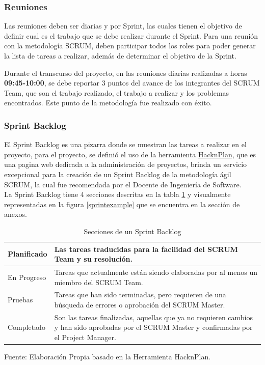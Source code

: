 \subsubsection{Reuniones}

Las reuniones deben ser diarias y por Sprint, las cuales tienen el objetivo de definir cual es el trabajo que se debe realizar durante el Sprint. Para una reunión con la metodología SCRUM, deben participar todos los roles para poder generar la lista de tareas a realizar, además de determinar el objetivo de la Sprint.

Durante el transcurso del proyecto, en las reuniones diarias realizadas a horas \textbf{09:45-10:00}, se debe reportar 3 puntos del avance de los integrantes del SCRUM Team, que son el trabajo realizado, el trabajo a realizar y los problemas encontrados. Este punto de la metodología fue realizado con éxito.

\subsubsection{Sprint Backlog}

El Sprint Backlog es una pizarra donde se muestran las tareas a realizar en el proyecto, para el proyecto, se definió el uso de la herramienta \href{https://hacknplan.com/}{HacknPlan}, que es una pagina web dedicada a la administración de proyectos, brinda un servicio excepcional para la creación de un Sprint Backlog de la metodología ágil SCRUM, la cual fue recomendada por el Docente de Ingeniería de Software.
\\
La Sprint Backlog tiene 4 secciones descritas en la tabla \ref{sprintbacklog} y visualmente representadas en la figura \ref{sprintexample} que se encuentra en la sección de anexos.


\begin{table}[t]
	\begin{center}
		\begin{tabular}{| m{3cm} | m{11cm} |  }
			\hline Planificado & Las tareas traducidas para la facilidad del SCRUM Team y su resolución. \\ \hline
			En Progreso & Tareas que actualmente están siendo elaboradas por al menos un miembro del SCRUM Team. \\ \hline
			Pruebas & Tareas que han sido terminadas, pero requieren de una búsqueda de errores o aprobación del SCRUM Master. \\ \hline
			Completado & Son las tareas finalizadas, aquellas que ya no requieren cambios y han sido aprobadas por el SCRUM Master y confirmadas por el Project Manager.  \\ \hline
		\end{tabular}
		\caption{Secciones de un Sprint Backlog}
		\label{sprintbacklog}
		\footnotesize Fuente: Elaboración Propia basado en la Herramienta HacknPlan.
	\end{center}
\end{table}

